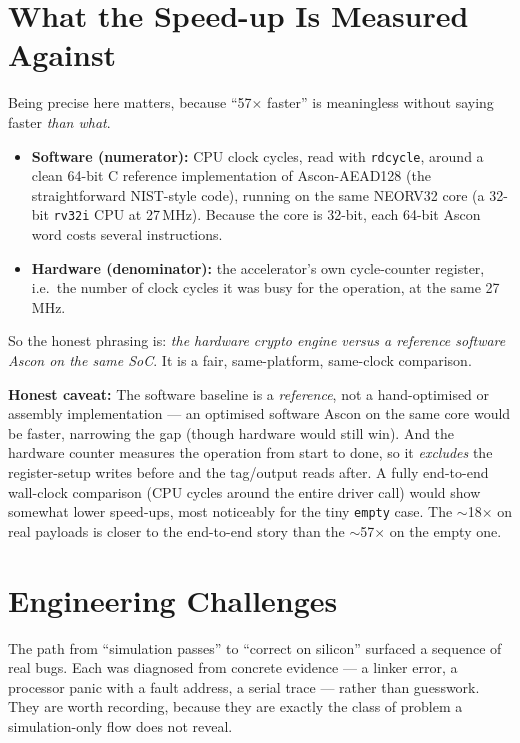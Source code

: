 \documentclass[11pt,a4paper]{article}
\newcommand{\warn}[1]{%
  \begin{tcolorbox}[enhanced, colback=warnbg, colframe=warnframe,
    arc=2pt, boxrule=0.5pt, left=6pt, right=6pt, top=3pt, bottom=3pt,
    before upper={\small}]
  \textbf{\color{warnframe}Honest caveat:} #1
  \end{tcolorbox}\vspace{3pt}}
\newcommand{\code}[1]{\texttt{\small #1}}
\begin{document}
\section{What the Speed-up Is Measured Against}
Being precise here matters, because ``57$\times$ faster'' is meaningless without
saying faster \emph{than what}.

\begin{itemize}
\item \textbf{Software (numerator):} CPU clock cycles, read with \code{rdcycle},
      around a clean 64-bit C reference implementation of Ascon-AEAD128 (the
      straightforward NIST-style code), running on the same NEORV32 core (a
      32-bit \code{rv32i} CPU at 27\,MHz). Because the core is 32-bit, each 64-bit
      Ascon word costs several instructions.
\item \textbf{Hardware (denominator):} the accelerator's own cycle-counter
      register, i.e.\ the number of clock cycles it was busy for the operation,
      at the same 27\,MHz.
\end{itemize}

So the honest phrasing is: \emph{the hardware crypto engine versus a reference
software Ascon on the same SoC}. It is a fair, same-platform, same-clock
comparison.

\warn{The software baseline is a \emph{reference}, not a hand-optimised or
assembly implementation --- an optimised software Ascon on the same core would be
faster, narrowing the gap (though hardware would still win). And the hardware
counter measures the operation from start to done, so it \emph{excludes} the
register-setup writes before and the tag/output reads after. A fully end-to-end
wall-clock comparison (CPU cycles around the entire driver call) would show
somewhat lower speed-ups, most noticeably for the tiny \code{empty} case. The
$\sim$18$\times$ on real payloads is closer to the end-to-end story than the
$\sim$57$\times$ on the empty one.}

\section{Engineering Challenges}
The path from ``simulation passes'' to ``correct on silicon'' surfaced a sequence
of real bugs. Each was diagnosed from concrete evidence --- a linker error, a
processor panic with a fault address, a serial trace --- rather than guesswork.
They are worth recording, because they are exactly the class of problem a
simulation-only flow does not reveal.
\end{document}
